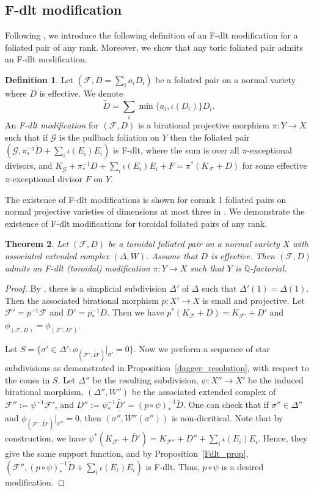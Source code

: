 \documentclass[12pt,reqno]{amsart}
\newtheorem{theorem}{Theorem}[section]
\theoremstyle{definition}
\newtheorem{definition}[theorem]{Definition}
\newcommand\cF{{\mathcal{F}}}
\newcommand\cG{{\mathcal{G}}}
\newcommand\bQ{{\mathbb Q}}
\begin{document}
\subsection{F-dlt modification}
Following \cite[Definition 3.28]{CS}, we introduce the following definition of an F-dlt modification for a foliated pair of any rank. 
Moreover, we show that any toric foliated pair admits an F-dlt modification. 
\begin{definition}
    Let $(\cF,D=\sum_ia_i D_i)$ be a foliated pair on a normal variety where $D$ is effective. 
    We denote \[\widetilde{D}=\sum_i\min\{a_i,\iota(D_i)\}D_i.\] 
    An \emph{F-dlt modification} for $(\cF,D)$ is a birational projective morphism $\pi\colon Y\to X$ such that if $\cG$ is the pullback foliation on $Y$ then the foliated pair $(\cG,\pi_*^{-1}\widetilde{D}+\sum_i\iota(E_i)E_i)$ is F-dlt, where the sum is over all $\pi$-exceptional divisors, and $K_\cG+\pi_*^{-1}D+\sum_i\iota(E_i)E_i+F=\pi^*(K_\cF+D)$ for some effective $\pi$-exceptional divisor $F$ on $Y$. 
\end{definition}

The existence of F-dlt modifications is shown for corank 1 foliated pairs on normal projective varieties of dimensions at most three in \cite[Theorem 8.1]{CS}. 
We demonstrate the existence of F-dlt modifications for toroidal foliated pairs of any rank. 

\begin{theorem}\label{Fdlt_modification}
    Let $(\cF,D)$ be a toroidal foliated pair on a normal variety $X$ with associated extended complex $(\Delta,W)$. 
    Assume that $D$ is effective. 
    Then $(\cF,D)$ admits an F-dlt (toroidal) modification $\pi\colon Y\to X$ such that $Y$ is $\bQ$-factorial. 
\end{theorem}
\begin{proof}
    By \cite[Proposition 11.1.7]{CLS11}, there is a simplicial subdivision $\Delta'$ of $\Delta$ such that $\Delta'(1)=\Delta(1)$. 
    Then the associated birational morphism $p\colon X' \to X$ is small and projective. 
    Let $\cF'=p^{-1}\cF$ and $D'=p_*^{-1}D$. 
    Then we have $p^*(K_{\cF}+D)=K_{\cF'}+D'$ and $\phi_{(\cF,D)} = \phi_{(\cF',D')}$. 

    Let $S=\{\sigma'\in\Delta':\phi_{(\cF',\widetilde{D'})}\vert_{\sigma'}=0\}$. 
    Now we perform a sequence of star subdivisions as demonstrated in Proposition~\ref{dagger_resolution}, with respect to the cones in $S$. Let $\Delta''$ be the resulting subdivision, $\psi\colon X''\to X'$ be the induced birational morphism, $(\Delta'',W'')$ be the associated extended complex of $\cF'':=\psi^{-1}\cF'$, and $D'':=\psi^{-1}_*\widetilde{D'}=(p\circ\psi)_*^{-1}\widetilde{D}$. 
    One can check that if $\sigma''\in\Delta''$ and $\phi_{(\cF',\widetilde{D'})}\vert_{\sigma''}=0$, then 
    $(\sigma'',W''(\sigma''))$ is non-dicritical.
    Note that by construction, we have $\psi^*(K_{\cF'}+\widetilde{D'})=K_{\cF''}+D''+\sum_i\iota(E_i)E_i$. 
    Hence, they give the same support function, and by Proposition~\ref{Fdlt_prop}, $(\cF'',(p\circ\psi)_*^{-1}\widetilde{D}+\sum_i\iota(E_i)E_i)$ is F-dlt. Thus, $p\circ \psi$ is a desired modification. 
\end{proof}
\end{document}
